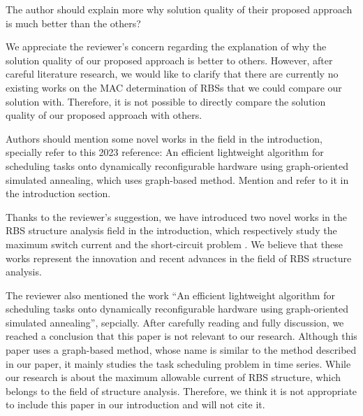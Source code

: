 \begin{revcomment}
  The author should explain more why solution quality of their proposed approach is much better than the others?
\end{revcomment}
\begin{revresponse}

We appreciate the reviewer's concern regarding the explanation of why the solution quality of our proposed approach is better to others. 
However, after careful literature research, we would like to clarify that there are currently no existing works on the MAC determination of RBSs that we could compare our solution with. 
Therefore, it is not possible to directly compare the solution quality of our proposed approach with others.
  
\end{revresponse}

\begin{revcomment}
  Authors should mention some novel works in the field in the introduction, specially refer to this 2023 reference: An efficient lightweight algorithm for scheduling tasks onto dynamically reconfigurable hardware using graph-oriented simulated annealing, which uses graph-based method. Mention and refer to it in the introduction section.
\end{revcomment}
\begin{revresponse}

Thanks to the reviewer's suggestion, we have introduced two novel works in the RBS structure analysis field in the introduction, which respectively study the maximum switch current \cite{han2021analysis} and the short-circuit problem \cite{chenSneakCircuitTheory2021}.
We believe that these works represent the innovation and recent advances in the field of RBS structure analysis.


The reviewer also mentioned the work \enquote{An efficient lightweight algorithm for scheduling tasks onto dynamically reconfigurable hardware using graph-oriented simulated annealing}, sepcially.
After carefully reading and fully discussion, we reached a conclusion that this paper is not relevant to our research.
Although this paper uses a graph-based method, whose name is similar to the method described in our paper, it mainly studies the task scheduling problem in time series.
While our research is about the maximum allowable current of RBS structure, which belongs to the field of structure analysis.
Therefore, we think it is not appropriate to include this paper in our introduction and will not cite it.
  
\end{revresponse}

